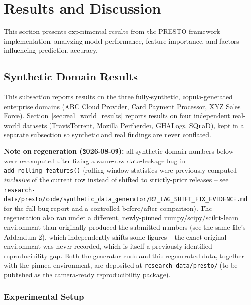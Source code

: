 \documentclass[technologies,article,submit,pdftex,moreauthors]{Definitions/mdpi}
\begin{document}
\section{Results and Discussion}\label{sec:results}

This section presents experimental results from the PRESTO framework
implementation, analyzing model performance, feature importance, and
factors influencing prediction accuracy.

\subsection{Synthetic Domain Results}\label{sec:synthetic_results}

This subsection reports results on the three fully-synthetic,
copula-generated enterprise domains (ABC Cloud Provider, Card Payment
Processor, XYZ Sales Force). Section~\ref{sec:real_world_results} reports results on four
independent real-world datasets (TravisTorrent, Mozilla Perfherder,
GHALogs, SQuaD), kept in a separate subsection so synthetic and real
findings are never conflated.

\textbf{Note on regeneration (2026-08-09):} all synthetic-domain numbers
below were recomputed after fixing a same-row data-leakage bug in
\texttt{add\_rolling\_features()} (rolling-window statistics were
previously computed \emph{inclusive} of the current row instead of
shifted to strictly-prior releases -- see
\texttt{research-data/\allowbreak presto/\allowbreak code/\allowbreak synthetic\_\allowbreak data\_\allowbreak generator/\allowbreak R2\_\allowbreak LAG\_\allowbreak SHIFT\_\allowbreak FIX\_\allowbreak EVIDENCE.md}
for the full bug report and a controlled before/after comparison). The
regeneration also ran under a different, newly-pinned
numpy/scipy/scikit-learn environment than originally produced the
submitted numbers (see the same file's Addendum 2), which independently
shifts some figures -- the exact original environment was never
recorded, which is itself a previously identified reproducibility gap. Both
the generator code and this regenerated data, together with the pinned
environment, are deposited at \texttt{research-data/presto/} (to be
published as the camera-ready reproducibility package).

\subsubsection{Experimental Setup}\label{sec:results_setup}
\end{document}

